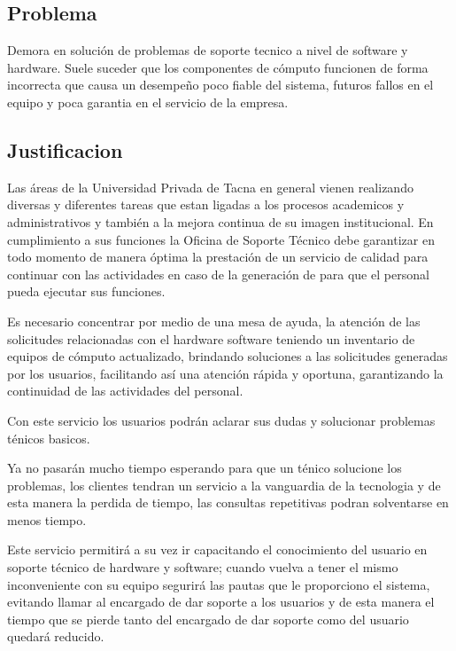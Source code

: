 \documentclass[preprint,12pt]{elsarticle}
\begin{document}

\subsection {\textbf{Problema}}
Demora en solución de problemas de soporte tecnico a nivel de software y hardware. Suele suceder que los componentes de cómputo funcionen de forma incorrecta que causa un desempeño poco fiable del sistema, futuros fallos en el equipo y poca garantia en el servicio de la empresa.


\subsection {\textbf{Justificacion}}

Las áreas de la Universidad Privada de Tacna en general vienen realizando diversas y diferentes tareas que estan ligadas a los procesos academicos y administrativos y también a la mejora continua de su imagen institucional.
En cumplimiento a sus funciones la Oficina de Soporte Técnico debe garantizar en todo momento de manera óptima la prestación de un servicio de calidad para continuar con las actividades en caso de la generación de para que el personal pueda ejecutar sus funciones.
 
Es necesario concentrar por medio de una mesa de ayuda, la atención de las solicitudes relacionadas con el hardware  software teniendo un inventario de equipos de cómputo actualizado, brindando soluciones a las solicitudes generadas por los usuarios, facilitando así una atención rápida y oportuna, garantizando la continuidad de las actividades del personal.

Con este servicio los usuarios podrán aclarar sus dudas y solucionar problemas ténicos basicos.

Ya no pasarán mucho tiempo esperando para que un ténico solucione los problemas, los clientes tendran un servicio a la vanguardia de la tecnologia y de esta manera la perdida de tiempo, las consultas repetitivas podran solventarse en menos tiempo.

Este servicio permitirá a su vez ir capacitando el conocimiento del usuario en soporte técnico de hardware y software; cuando vuelva a tener el mismo inconveniente con su equipo segurirá las pautas que le proporciono el sistema, evitando llamar al encargado de dar soporte a los usuarios y de esta manera el tiempo que se pierde tanto del encargado de dar soporte como del usuario quedará reducido.
\end{document}
